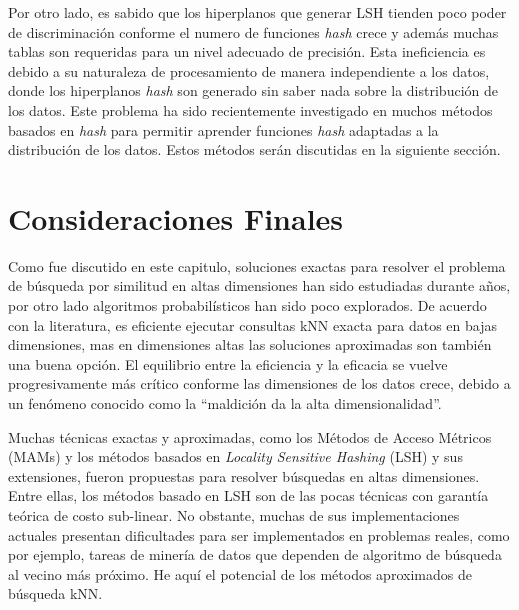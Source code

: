 Por otro lado, es  sabido que los hiperplanos que generar LSH tienden  poco  poder de discriminación conforme el numero de funciones \textit{hash} crece y además muchas tablas son requeridas para un nivel adecuado de precisión. Esta ineficiencia es debido a su naturaleza de procesamiento de manera independiente a los datos, donde los hiperplanos \textit{hash} son generado sin saber nada sobre la distribución de los datos.  Este problema  ha sido recientemente investigado en muchos métodos basados en \textit{hash} para permitir aprender funciones \textit{hash} adaptadas a la distribución de los datos. Estos métodos serán  discutidas en la siguiente sección. 

 
 
 
\section{Consideraciones Finales}

Como fue discutido en este capitulo,  soluciones exactas para  resolver el problema de búsqueda por similitud en altas dimensiones han sido estudiadas durante años, por otro lado algoritmos probabilísticos han sido poco explorados. De acuerdo con la literatura, es eficiente ejecutar consultas kNN exacta para datos en bajas dimensiones, mas en dimensiones altas las soluciones aproximadas son también una buena opción. El equilibrio entre la eficiencia y la eficacia se vuelve progresivamente más crítico conforme las dimensiones de los datos crece, debido a un fenómeno conocido como   la ``maldición  da la alta dimensionalidad''.

Muchas técnicas exactas y aproximadas, como los Métodos de Acceso Métricos (MAMs) y los métodos basados en \textit{Locality Sensitive Hashing} (LSH) y sus extensiones, fueron propuestas para resolver búsquedas en altas dimensiones.  Entre ellas, los métodos basado en LSH son de las pocas técnicas con garantía teórica de costo sub-linear. No obstante, muchas de sus implementaciones actuales presentan dificultades para ser implementados en problemas reales, como por ejemplo, tareas de minería de datos que dependen de algoritmo de búsqueda al vecino más próximo. He aquí el potencial de los métodos aproximados de búsqueda kNN.
 
